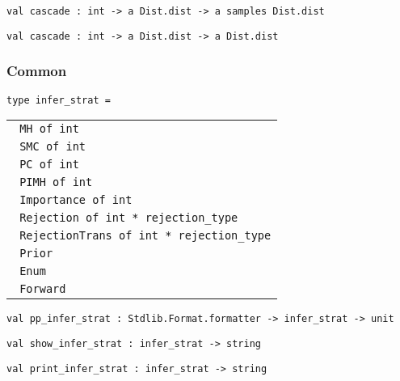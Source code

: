 \protect\hyperlink{val-cascade}{}\texttt{val\ cascade\ :\ int\ -\textgreater{}\ \textquotesingle{}a\ Dist.dist\ -\textgreater{}\ \textquotesingle{}a\ samples\ Dist.dist}

\protect\hyperlink{val-cascadeux27}{}\texttt{val\ cascade\textquotesingle{}\ :\ int\ -\textgreater{}\ \textquotesingle{}a\ Dist.dist\ -\textgreater{}\ \textquotesingle{}a\ Dist.dist}

\hypertarget{com}{\subsubsection{\texorpdfstring{\protect\hyperlink{com}{}Common}{Common}}\label{com}}

\protect\hyperlink{type-inferux5fstrat}{}\texttt{type\ infer\_strat}\texttt{\ =\ }

\begin{longtable}[c]{@{}l@{}}
\toprule
\protect\hyperlink{type-inferux5fstrat.MH}{}\texttt{\textbar{}\ }\texttt{MH\ of\ int}\tabularnewline
\protect\hyperlink{type-inferux5fstrat.SMC}{}\texttt{\textbar{}\ }\texttt{SMC\ of\ int}\tabularnewline
\protect\hyperlink{type-inferux5fstrat.PC}{}\texttt{\textbar{}\ }\texttt{PC\ of\ int}\tabularnewline
\protect\hyperlink{type-inferux5fstrat.PIMH}{}\texttt{\textbar{}\ }\texttt{PIMH\ of\ int}\tabularnewline
\protect\hyperlink{type-inferux5fstrat.Importance}{}\texttt{\textbar{}\ }\texttt{Importance\ of\ int}\tabularnewline
\protect\hyperlink{type-inferux5fstrat.Rejection}{}\texttt{\textbar{}\ }\texttt{Rejection\ of\ int\ *\ rejection\_type}\tabularnewline
\protect\hyperlink{type-inferux5fstrat.RejectionTrans}{}\texttt{\textbar{}\ }\texttt{RejectionTrans\ of\ int\ *\ rejection\_type}\tabularnewline
\protect\hyperlink{type-inferux5fstrat.Prior}{}\texttt{\textbar{}\ }\texttt{Prior}\tabularnewline
\protect\hyperlink{type-inferux5fstrat.Enum}{}\texttt{\textbar{}\ }\texttt{Enum}\tabularnewline
\protect\hyperlink{type-inferux5fstrat.Forward}{}\texttt{\textbar{}\ }\texttt{Forward}\tabularnewline
\bottomrule
\end{longtable}

\protect\hyperlink{val-ppux5finferux5fstrat}{}\texttt{val\ pp\_infer\_strat\ :\ Stdlib.Format.formatter\ -\textgreater{}\ infer\_strat\ -\textgreater{}\ unit}

\protect\hyperlink{val-showux5finferux5fstrat}{}\texttt{val\ show\_infer\_strat\ :\ infer\_strat\ -\textgreater{}\ string}

\protect\hyperlink{val-printux5finferux5fstrat}{}\texttt{val\ print\_infer\_strat\ :\ infer\_strat\ -\textgreater{}\ string}

